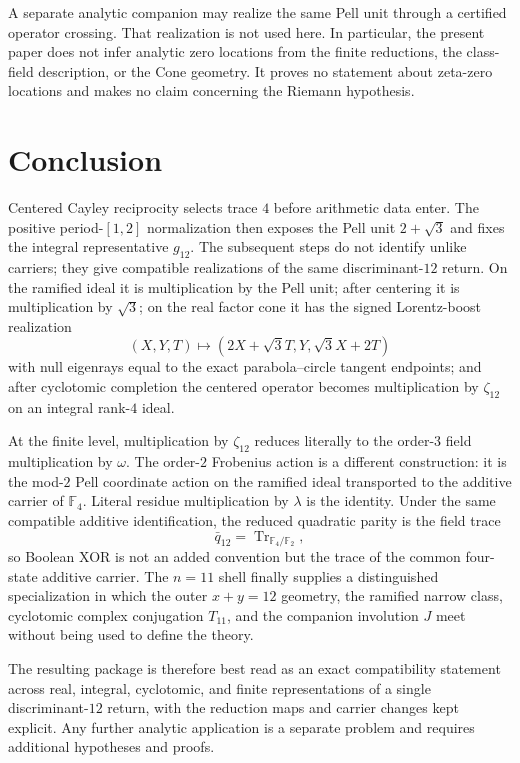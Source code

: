 \documentclass[11pt]{article}
\theoremstyle{remark}
\newcommand{\F}{\mathbb F}
\newcommand{\Tr}{\operatorname{Tr}}
\begin{document}
A separate analytic companion may realize the same Pell unit through a
certified operator crossing.  That realization is not used here.  In
particular, the present paper does not infer analytic zero locations from the
finite reductions, the class-field description, or the Cone geometry.  It
proves no statement about zeta-zero locations and makes no claim concerning
the Riemann hypothesis.

\section{Conclusion}

Centered Cayley reciprocity selects trace $4$ before arithmetic data enter.
The positive period-$[1,2]$ normalization then exposes the Pell unit
$2+\sqrt3$ and fixes the integral representative $g_{12}$.  The subsequent
steps do not identify unlike carriers; they give compatible realizations of
the same discriminant-$12$ return.  On the ramified ideal it is multiplication
by the Pell unit; after centering it is multiplication by $\sqrt3$; on the
real factor cone it has the signed Lorentz-boost realization
\[
(X,Y,T)\mapsto(2X+\sqrt3T,Y,\sqrt3X+2T)
\]
with null eigenrays equal to the exact parabola--circle tangent endpoints; and
after cyclotomic completion the centered operator becomes multiplication by
$\zeta_{12}$ on an integral rank-$4$ ideal.

At the finite level, multiplication by $\zeta_{12}$ reduces literally to the
order-$3$ field multiplication by $\omega$.  The order-$2$ Frobenius action is
a different construction: it is the mod-$2$ Pell coordinate action on the
ramified ideal transported to the additive carrier of $\F_4$.  Literal residue
multiplication by $\lambda$ is the identity.  Under the same compatible
additive identification, the reduced quadratic parity is the field trace
\[
\bar q_{12}=\Tr_{\F_4/\F_2},
\]
so Boolean XOR is not an added convention but the trace of the common
four-state additive carrier.  The $n=11$ shell finally supplies a distinguished
specialization in which the outer $x+y=12$ geometry, the ramified narrow class,
cyclotomic complex conjugation $T_{11}$, and the companion involution $J$ meet
without being used to define the theory.

The resulting package is therefore best read as an exact compatibility
statement across real, integral, cyclotomic, and finite representations of a
single discriminant-$12$ return, with the reduction maps and carrier changes
kept explicit.  Any further analytic application is a separate problem and
requires additional hypotheses and proofs.
\end{document}
